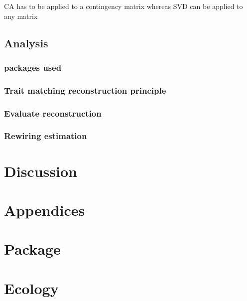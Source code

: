 \documentclass{article}
\begin{document}
CA has to be applied to a contingency matrix whereas SVD can be applied to any matrix

\subsection{Analysis}

\subsubsection{packages used}

\subsubsection{Trait matching reconstruction principle}

\subsubsection{Evaluate reconstruction}

\subsubsection{Rewiring estimation}

\section{Discussion}

\section{Appendices}

\section{Package}

\section{Ecology}
\end{document}
